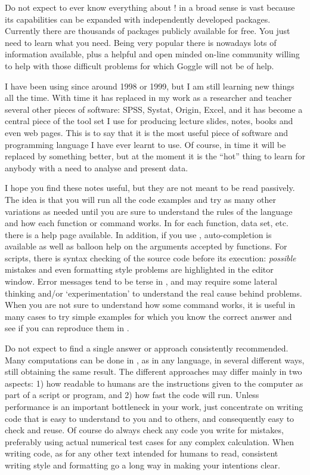 \documentclass[paper=a4,headsepline,BCOR=12mm,twoside,open=right,%
titlepage,headings=small,fontsize=10pt,index=totoc,bibliography=totoc,%
captions=tableheading,captions=nooneline]{scrbook}\usepackage{knitr}
\begin{document}
Do not expect to ever know everything about \R! \R in a broad sense is vast because its capabilities can be expanded with independently developed packages. Currently there are thousands of packages publicly available for free. You just need to learn what you need. Being very popular there is nowadays lots of information available, plus a helpful and open minded on-line community willing to help with those difficult problems for which Goggle will not be of help.

I have been using \R since around 1998 or 1999, but I am still learning new things all the time. With time it has replaced in my work as a researcher and teacher several other pieces of software: \textsf{SPSS}, \textsf{Systat}, \textsf{Origin}, \textsf{Excel}, and it has become a central piece of the tool set I use for producing lecture slides, notes, books and even web pages. This is to say that it is the most useful piece of software and programming language I have ever learnt to use. Of course, in time it will be replaced by something better, but at the moment it is the ``hot'' thing to learn for anybody with a need to analyse and present data.

I hope you find these notes useful, but they are not meant to be read passively. The idea is that you will run all the code examples and try as many other variations as needed until you are sure to understand the rules of the \R language and how each function or command works. In \R for each function, data set, etc. there is a help page available. In addition, if you use \RStudio, auto-completion is available as well as balloon help on the arguments accepted by functions. For scripts, there is syntax checking of the source code before its execution: \emph{possible} mistakes and even formatting style problems are highlighted in the editor window. Error messages tend to be terse in \R, and may require some lateral thinking and/or `experimentation' to understand the real cause behind problems. When you are not sure to understand how some command works, it is useful in many cases to try simple examples for which you know the correct answer and see if you can reproduce them in \R.

Do not expect to find a single answer or approach consistently recommended. Many computations can be done in \R, as in any language, in several different ways, still obtaining the same result. The different approaches may differ mainly in two aspects: 1) how readable to humans are the instructions given to the computer as part of a script or program, and 2) how fast the code will run. Unless performance is an important bottleneck in your work, just concentrate on writing code that is easy to understand to you and to others, and consequently easy to check and reuse. Of course do always check any code you write for mistakes, preferably using actual numerical test cases for any complex calculation. When writing code, as for any other text intended for humans to read, consistent writing style and formatting go a long way in making your intentions clear.
\end{document}
